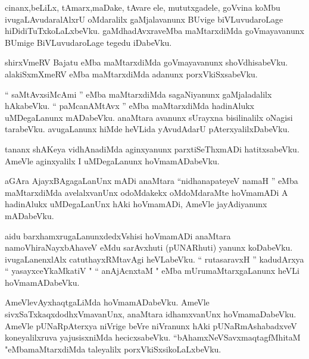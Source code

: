 \documentclass{article}
\begin{document}
\begin{mn}
cinanx,beLiLx,  tAmarx,maDake,  tAvare ele,  mututxgadele,  goVvina  koMbu  ivugaLAvudaralAlxrU  
oMdaralilx  gaMjalavanunx  BUvige  biVLuvudaroLage  hiDidiTuTxkoLaLxbeVku.  gaMdhadAvxraveMba  
maMtarxdiMda  goVmayavanunx  BUmige  BiVLuvudaroLage  tegedu  iDabeVku.
\end{mn}

\begin{mn}
shirxVmeRV  Bajatu  eMba  maMtarxdiMda  goVmayavanunx  shoVdhisabeVku.  alakiSxmXmeRV  eMba  
maMtarxdiMda  adanunx  porxVkiSxsabeVku.
\end{mn}

\begin{mn}
`` saMtAvxsiMcAmi ''  eMba  maMtarxdiMda  sagaNiyanunx  gaMjaladalilx  hAkabeVku. `` paMcanAMtAvx ''  
eMba  maMtarxdiMda  hadinAlukx  uMDegaLanunx  mADabeVku.  anaMtara  avanunx  sUrayxna  bisilinalilx  
oNagisi  tarabeVku.  avugaLanunx  hiMde  heVLida  yAvudAdarU  pAterxyalilxDabeVku.
\end{mn}

\begin{mn}
tananx  shAKeya  vidhAnadiMda  aginxyanunx  parxtiSeThxmADi  hatitxsabeVku.  AmeVle  aginxyalilx  
I  uMDegaLanunx  hoVmamADabeVku.
\end{mn}

\begin{mn}
aGAra  AjayxBAgagaLanUnx  mADi  anaMtara  ``nidhanapateyeV  namaH ''  eMba  maMtarxdiMda  avelalxvanUnx  
odoMdakekx  oMdoMdaraMte  hoVmamADi  A  hadinAlukx  uMDegaLanUnx  hAki  hoVmamADi,  AmeVle  jayAdiyanunx  mADabeVku. 
\end{mn}

\begin{mn}
aidu  barxhamxrugaLanunxdedxVshisi  hoVmamADi  anaMtara  namoVhiraNayxbAhaveV  eMdu  sarAvxhuti (pUNARhuti) yanunx  
koDabeVku.  ivugaLanenxlAlx  catuthayxRMtavAgi  heVLabeVku.  `` rutasaravxH ''  kadudArxya  `` yasayxceYkaMkatiV "  
`` anAjAcnxtaM "  eMba  mUrumaMtarxgaLanunx  heVLi  hoVmamADabeVku.
\end{mn}

\begin{mn}
AmeVlevAyxhaqtgaLiMda  hoVmamADabeVku.  AmeVle  sivxSaTxkaqxdodhxVmavanUnx,  anaMtara  idhamxvanUnx  
hoVmamaDabeVku.  AmeVle  pUNaRpAterxya  niVrige  beVre  niVranunx  hAki  pUNaRmAshabadxveV  koneyalilxruva  
yajusisxniMda  hecicxsabeVku.  ``bAhamxNeVSavxmaqtagfMhitaM "eMbamaMtarxdiMda  taleyalilx  porxVkiSxsikoLaLxbeVku.
\end{mn}
\end{document}
